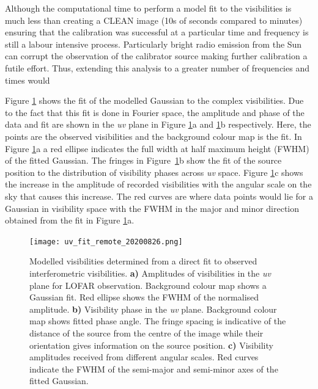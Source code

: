 Although the computational time to perform a model fit to the visibilities is much less than creating a CLEAN image (10s of seconds compared to minutes) ensuring that the calibration was successful at a particular time and frequency is still a labour intensive process. Particularly bright radio emission from the Sun can corrupt the observation of the calibrator source making further calibration a futile effort. Thus, extending this analysis to a greater number of frequencies and times would 

Figure \ref{fig:uv_fit} shows the fit of the modelled Gaussian to the complex visibilities. Due to the fact that this fit is done in Fourier space, the amplitude and phase of the data and fit are shown in the \textit{uv} plane in Figure \ref{fig:uv_fit}a and \ref{fig:uv_fit}b respectively. Here, the points are the observed visibilities and the background colour map is the fit. In Figure \ref{fig:uv_fit}a a red ellipse indicates the full width at half maximum height (FWHM) of the fitted Gaussian. The fringes in Figure~\ref{fig:uv_fit}b show the fit of the source position to the distribution of visibility phases across \textit{uv} space.
Figure \ref{fig:uv_fit}c shows the increase in the amplitude of recorded visibilities with the angular scale on the sky that causes this increase. The red curves are where data points would lie for a Gaussian in visibility space with the FWHM in the major and minor direction obtained from the fit in Figure \ref{fig:uv_fit}a.

\begin{figure}
    \centering
    \texttt{[image: uv\_fit\_remote\_20200826.png]}
    \caption[Results of directly fitting LOFAR visibilities.]{Modelled visibilities determined from a direct fit to observed interferometric visibilities. \textbf{a)} Amplitudes of visibilities in the \textit{uv} plane for LOFAR observation. Background colour map shows a Gaussian fit. Red ellipse shows the FWHM of the normalised amplitude. \textbf{b)} Visibility phase in the \textit{uv} plane. Background colour map shows fitted phase angle. The fringe spacing is indicative of the distance of the source from the centre of the image while their orientation gives information on the source position. \textbf{c)} Visibility amplitudes received from different angular scales. Red curves indicate the FWHM of the semi-major and semi-minor axes of the fitted Gaussian.}
    \label{fig:uv_fit}
\end{figure}


